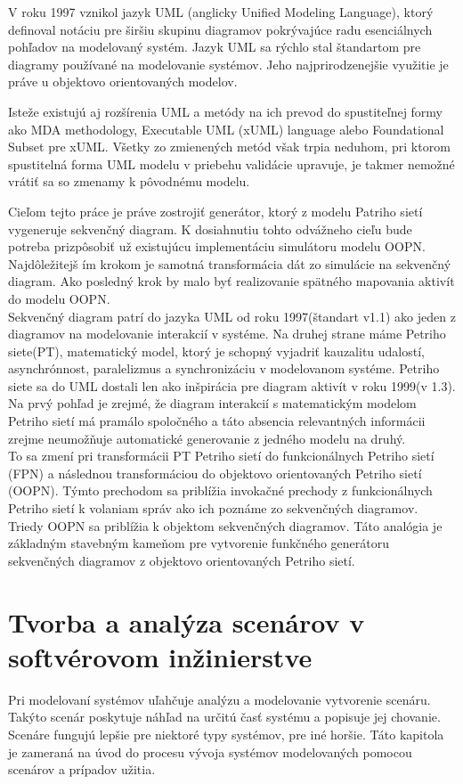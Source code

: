 V roku 1997 vznikol jazyk UML (anglicky Unified Modeling Language), ktorý definoval notáciu pre širšiu skupinu diagramov pokrývajúce radu esenciálnych pohľadov na modelovaný systém. Jazyk UML sa rýchlo stal štandartom pre diagramy používané na modelovanie systémov. Jeho najprirodzenejšie využitie je práve u objektovo orientovaných modelov.

 Isteže existujú aj rozšírenia UML a metódy na ich prevod do spustiteľnej formy ako MDA methodology, Executable UML (xUML) language alebo Foundational Subset pre xUML. Všetky zo zmienených metód však trpia neduhom, pri ktorom spustitelná forma UML modelu v priebehu validácie upravuje, je takmer nemožné vrátiť sa so zmenamy k pôvodnému modelu. 

Cieľom tejto práce je práve zostrojiť generátor, ktorý z modelu Patriho sietí vygeneruje sekvenčný diagram. K dosiahnutiu tohto odvážneho cieľu bude potreba prizpôsobiť už existujúcu implementáciu simulátoru modelu OOPN. Najdôležitejš ím  krokom je samotná transformácia dát zo simulácie na sekvenčný diagram. Ako posledný krok by malo byť realizovanie spätného mapovania aktivít do modelu OOPN. \\

Sekvenčný diagram patrí do jazyka UML od roku 1997(štandart v1.1) ako jeden z diagramov na modelovanie interakcií v systéme. Na druhej strane máme Petriho siete(PT), matematický model, ktorý je schopný vyjadriť kauzalitu udalostí, asynchrónnost, paralelizmus a synchronizáciu v modelovanom systéme. Petriho siete sa do UML dostali len ako inšpirácia pre diagram aktivít v roku 1999(v 1.3). Na prvý pohľad je zrejmé, že diagram interakcií s matematickým modelom Petriho sietí má pramálo spoločného a táto absencia relevantných informácii zrejme neumožňuje automatické generovanie z jedného modelu na druhý. \\

To sa zmení pri transformácii PT Petriho sietí do  funkcionálnych Petriho sietí (FPN) a následnou transformáciou do objektovo orientovaných Petriho sietí (OOPN). Týmto prechodom sa priblížia invokačné prechody z funkcionálnych Petriho sietí k volaniam správ ako ich poznáme zo sekvenčných diagramov. Triedy OOPN sa priblížia k objektom sekvenčných diagramov. Táto analógia je základným stavebným kameňom pre vytvorenie funkčného generátoru sekvenčných diagramov z objektovo orientovaných Petriho sietí.


\chapter{Tvorba a analýza scenárov v softvérovom inžinierstve}
Pri modelovaní systémov uľahčuje analýzu a modelovanie vytvorenie scenáru. Takýto scenár poskytuje náhľad na určitú časť systému a popisuje jej chovanie. Scenáre fungujú lepšie pre niektoré typy systémov, pre iné horšie. Táto kapitola je zameraná na úvod do procesu vývoja systémov modelovaných pomocou scenárov a prípadov užitia.


